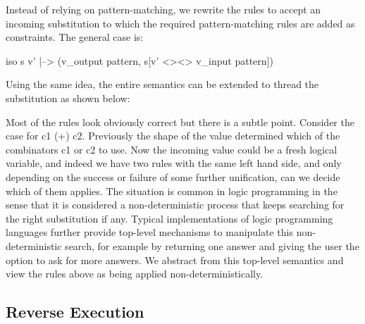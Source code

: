 \documentclass[preprint]{sigplanconf}
\begin{document}
\noindent
Instead of relying on pattern-matching, we rewrite the rules to accept an
incoming substitution to which the required pattern-matching rules are added
as constraints. The general case is:

{{ iso s v' |--> (v_{output pattern}, s[v' <><> v_{input pattern}]) }}

Using the same idea, the entire semantics can be extended to thread
the substitution as shown below:


Most of the rules look obviously correct but there is a subtle
point. Consider the case for {{c1 (+) c2}}. Previously the shape of the value
determined which of the combinators {{c1}} or {{c2}} to use. Now the incoming
value could be a fresh logical variable, and indeed we have two rules with
the same left hand side, and only depending on the success or failure of some
further unification, can we decide which of them applies. The situation is
common in logic programming in the sense that it is considered a
non-deterministic process that keeps searching for the right substitution if
any. Typical implementations of logic programming languages further provide
top-level mechanisms to manipulate this non-deterministic search, for example
by returning one answer and giving the user the option to ask for more
answers. We abstract from this top-level semantics and view the rules above
as being applied non-deterministically.

\subsection{Reverse Execution}
\end{document}
